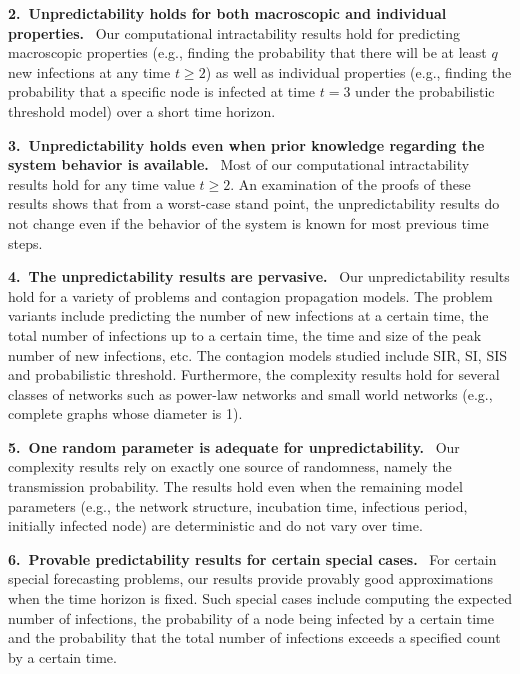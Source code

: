 \medskip
\noindent
\textbf{2.~Unpredictability holds for both macroscopic and individual properties.} \ 
Our computational intractability results hold for predicting 
macroscopic properties (e.g., finding the probability that there will be at least
$q$ new infections at any time $t \geq 2$) as well as individual properties
(e.g., finding the probability that a specific node is infected at time $t = 3$
under the probabilistic threshold model) over a short time horizon.

\medskip
\noindent
\textbf{3.~Unpredictability holds even when prior knowledge regarding
the system behavior is available.} \ 
Most of our computational intractability results hold for any time value $t \geq 2$.
An examination of the proofs of these results shows that
from a worst-case stand point, the unpredictability results do not change
even if the behavior of the system is known for most previous time steps. 

\medskip
\noindent
\textbf{4.~The unpredictability results are pervasive.} \
Our unpredictability results hold for a variety of problems 
and contagion propagation models. 
The problem variants include predicting the number of new infections
at a certain time, the total number of infections up to a certain time,
the time and size of the peak number of new infections, etc.
The contagion models studied include SIR, SI, SIS and probabilistic
threshold. 
Furthermore, the complexity results hold for
several classes of networks such as power-law networks and small world
networks (e.g., complete graphs whose diameter is 1).

\medskip
\noindent
\textbf{5.~One random parameter is adequate for unpredictability.} \ 
Our complexity results rely on exactly one source of randomness, namely
the transmission probability. 
The results hold even when the remaining model parameters 
(e.g., the network structure, 
incubation time, infectious period, initially infected node)
are deterministic and do not vary over time.  

\medskip
\noindent
\textbf{6.~Provable predictability results for certain special cases.} \
For certain special forecasting problems, our results provide 
provably good approximations when the time horizon is fixed.
Such special cases include computing the expected number of infections,  
the probability of a node being infected by a certain time and the
probability that the total number of infections exceeds a specified 
count by a certain time.  

